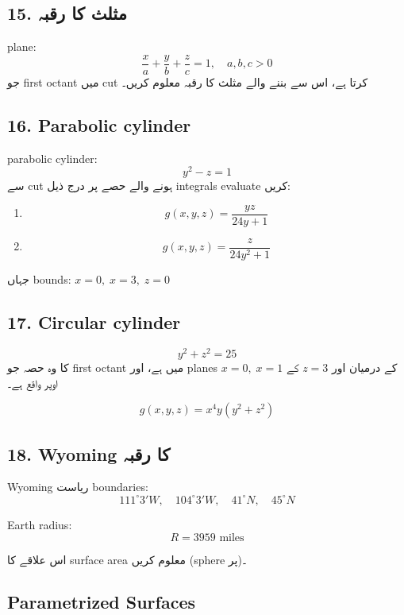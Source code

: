 \begin{enumerate}
\subsection*{15. مثلث کا رقبہ}

plane:
\[
\frac{x}{a} + \frac{y}{b} + \frac{z}{c} = 1,\quad a,b,c>0
\]
جو first octant میں cut کرتا ہے، اس سے بننے والے مثلث کا رقبہ معلوم کریں۔

\bigskip

\subsection*{16. Parabolic cylinder}

parabolic cylinder:
\[
y^2 - z = 1
\]
سے cut ہونے والے حصے پر درج ذیل integrals evaluate کریں:

\begin{enumerate}
\item
\[
g(x,y,z) = \frac{yz}{24y+1}
\]

\item
\[
g(x,y,z) = \frac{z}{24y^2+1}
\]
\end{enumerate}

جہاں bounds: \( x=0,\; x=3,\; z=0 \)

\bigskip

\subsection*{17. Circular cylinder}

\[
y^2 + z^2 = 25
\]
کا وہ حصہ جو first octant میں ہے، اور planes \( x=0,\; x=1 \) کے درمیان اور \( z=3 \) کے اوپر واقع ہے۔

\[
g(x,y,z) = x^4 y (y^2+z^2)
\]

\bigskip

\subsection*{18. Wyoming کا رقبہ}

Wyoming ریاست boundaries:
\[
111^\circ 3'W,\quad 104^\circ 3'W,\quad 41^\circ N,\quad 45^\circ N
\]

Earth radius:
\[
R = 3959 \text{ miles}
\]

اس علاقے کا surface area معلوم کریں (sphere پر)۔

\bigskip

\subsection*{Parametrized Surfaces}


\end{enumerate}

